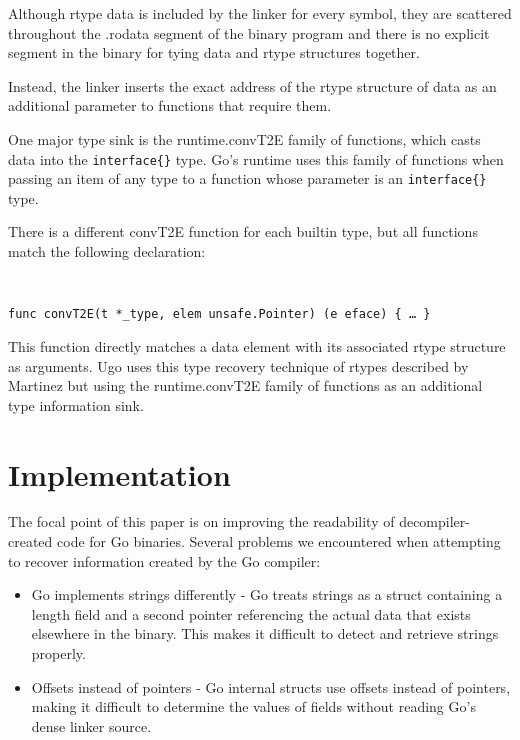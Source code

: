 \documentclass[letterpaper,twocolumn,10pt]{article}
\begin{document}
Although rtype data is included by the linker for every symbol, they are scattered throughout the .rodata segment of the binary program and there is no explicit segment in the binary for tying data and rtype structures together. 

Instead, the linker inserts the exact address of the rtype structure of data as an additional parameter to functions that require them. 

One major type sink is the runtime.convT2E family of functions, which casts data into the \texttt{interface\{\}} type. Go’s runtime uses this family of functions when passing an item of any type to a function whose parameter is an \texttt{interface\{\}} type. 

    There is a different convT2E function for each builtin type, but all functions match the following declaration:

{\tt \small
\begin{verbatim}
func convT2E(t *_type, elem unsafe.Pointer) (e eface) { … }
\end{verbatim}    
}

This function directly matches a data element with its associated rtype structure as arguments. Ugo uses this type recovery technique of rtypes described by Martinez \cite{martinez} but using the runtime.convT2E family of functions as an additional type information sink.

\section{Implementation}

The focal point of this paper is on improving the readability of decompiler-created code for Go binaries. Several problems we encountered when attempting to recover information created by the Go compiler:
\begin{itemize}
\item Go implements strings differently - Go treats strings as a struct containing a length field and a second pointer referencing the actual data that exists elsewhere in the binary. This makes it difficult to detect and retrieve strings properly.
\item Offsets instead of pointers - Go internal structs use offsets instead of pointers, making it difficult to determine the values of fields without reading Go’s dense linker source.
\end{itemize}
\end{document}

